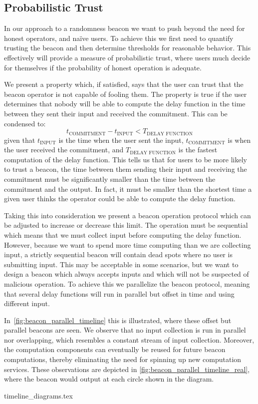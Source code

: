 \subsection{Probabilistic Trust}%
\label{sub:probabilistic_trust}
In our approach to a randomness beacon we want to push beyond the need for honest operators, and naïve users.
To achieve this we first need to quantify trusting the beacon and then determine thresholds for reasonable behavior.
This effectively will provide a measure of probabilistic trust, where users much decide for themselves if the probability of honest operation is adequate.

We present a property which, if satisfied, says that the user can trust that the beacon operator is not capable of fooling them.
The property is true if the user determines that nobody will be able to compute the delay function in the time between they sent their input and received the commitment.
This can be condensed to:
\begin{equation*}
    t_\text{COMMITMENT} - t_\text{INPUT} < T_\text{DELAY FUNCTION}
\end{equation*}
given that $t_\text{INPUT}$ is the time when the user sent the input, $t_\text{COMMITMENT}$ is when the user received the commitment, and $T_\text{DELAY FUNCTION}$ is the fastest computation of the delay function.
This tells us that for users to be more likely to trust a beacon, the time between them sending their input and receiving the commitment must be significantly smaller than the time between the commitment and the output.
In fact, it must be smaller than the shortest time a given user thinks the operator could be able to compute the delay function.

Taking this into consideration we present a beacon operation protocol which can be adjusted to increase or decrease this limit.
The operation must be sequential which means that we must collect input before computing the delay function.
However, because we want to spend more time computing than we are collecting input, a strictly sequential beacon will contain dead spots where no user is submitting input.
This may be acceptable in some scenarios, but we want to design a beacon which always accepts inputs and which will not be suspected of malicious operation.
To achieve this we parallelize the beacon protocol, meaning that several delay functions will run in parallel but offset in time and using different input.

In~\cref{fig:beacon_parallel_timeline} this is illustrated, where these offset but parallel beacons are seen.
We observe that no input collection is run in parallel nor overlapping, which resembles a constant stream of input collection.
Moreover, the computation components can eventually be reused for future beacon computations, thereby eliminating the need for spinning up new computation services.
These observations are depicted in \cref{fig:beacon_parallel_timeline_real}, where the beacon would output at each circle shown in the diagram.

{timeline_diagrams.tex}

